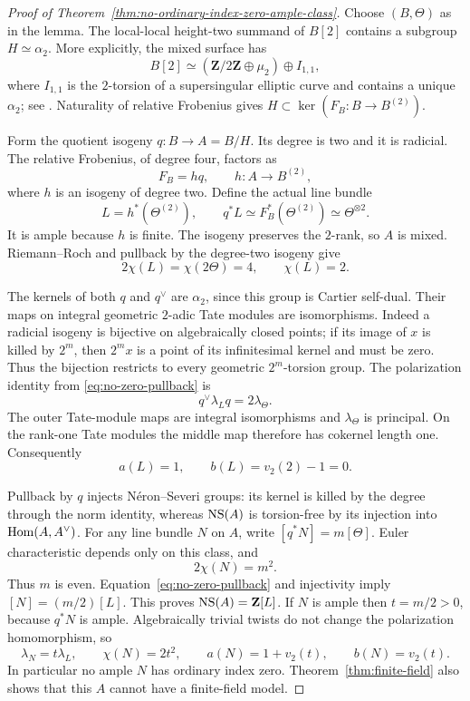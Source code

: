 \begin{proof}[Proof of Theorem~\ref{thm:no-ordinary-index-zero-ample-class}]
Choose $(B,\Theta)$ as in the lemma. The local-local height-two summand of $B[2]$ contains a subgroup $H\simeq\alpha_2$. More explicitly, the mixed surface has
\[
 B[2]\simeq(\mathbf Z/2\mathbf Z\oplus\mu_2)\oplus I_{1,1},
\]
where $I_{1,1}$ is the $2$-torsion of a supersingular elliptic curve and contains a unique $\alpha_2$; see \citet[Example~2.2, Lemma~3.1 and Propositions~3.2--3.3, author version pp.~1--4; genus-two table p.~6]{PriesTorsion}. Naturality of relative Frobenius gives $H\subset\ker(F_B:B\to B^{(2)})$.

Form the quotient isogeny $q:B\to A=B/H$. Its degree is two and it is radicial. The relative Frobenius, of degree four, factors as
\[
                    F_B=hq,\qquad h:A\longrightarrow B^{(2)},
\]
where $h$ is an isogeny of degree two. Define the actual line bundle
\begin{equation}\label{eq:no-zero-pullback}
 L=h^*(\Theta^{(2)}),\qquad q^*L\simeq F_B^*(\Theta^{(2)})
                              \simeq\Theta^{\otimes2}.
\end{equation}
It is ample because $h$ is finite. The isogeny preserves the $2$-rank, so $A$ is mixed. Riemann--Roch and pullback by the degree-two isogeny give
\[
                       2\chi(L)=\chi(2\Theta)=4,
                       \qquad \chi(L)=2.
\]

The kernels of both $q$ and $q^\vee$ are $\alpha_2$, since this group is Cartier self-dual. Their maps on integral geometric $2$-adic Tate modules are isomorphisms. Indeed a radicial isogeny is bijective on algebraically closed points; if its image of $x$ is killed by $2^m$, then $2^mx$ is a point of its infinitesimal kernel and must be zero. Thus the bijection restricts to every geometric $2^m$-torsion group. The polarization identity from \eqref{eq:no-zero-pullback} is
\[
                         q^\vee\lambda_Lq=2\lambda_\Theta.
\]
The outer Tate-module maps are integral isomorphisms and $\lambda_\Theta$ is principal. On the rank-one Tate modules the middle map therefore has cokernel length one. Consequently
\[
                         a(L)=1,\qquad b(L)=v_2(2)-1=0.
\]

Pullback by $q$ injects N\'eron--Severi groups: its kernel is killed by the degree through the norm identity, whereas $\operatorname{NS}(A)$ is torsion-free by its injection into $\operatorname{Hom}(A,A^\vee)$. For any line bundle $N$ on $A$, write $[q^*N]=m[\Theta]$. Euler characteristic depends only on this class, and
\[
                            2\chi(N)=m^2.
\]
Thus $m$ is even. Equation~\eqref{eq:no-zero-pullback} and injectivity imply $[N]=(m/2)[L]$. This proves $\operatorname{NS}(A)=\mathbf Z[L]$. If $N$ is ample then $t=m/2>0$, because $q^*N$ is ample. Algebraically trivial twists do not change the polarization homomorphism, so
\[
 \lambda_N=t\lambda_L,\qquad \chi(N)=2t^2,
 \qquad a(N)=1+v_2(t),\qquad b(N)=v_2(t).
\]
In particular no ample $N$ has ordinary index zero. Theorem~\ref{thm:finite-field} also shows that this $A$ cannot have a finite-field model.
\end{proof}

